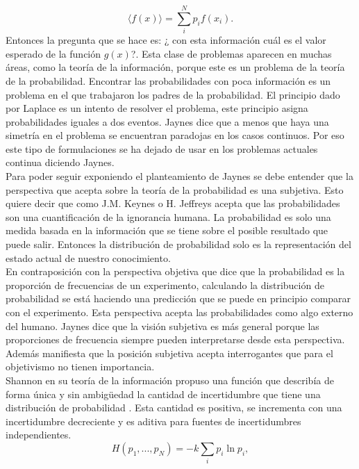 \begin{equation}
\langle f(x) \rangle =\sum_{i}^{N} p_{i} f(x_{i}).
\end{equation}
Entonces la pregunta que se hace es: ¿ con esta información cuál es el valor esperado de la función $g(x)$?. Esta clase de problemas aparecen en muchas áreas, como la teoría de la información, porque este es un problema de la teoría de la probabilidad. Encontrar las probabilidades con poca información es un problema en el que trabajaron los padres de la probabilidad. El principio dado por Laplace es un intento de resolver el problema, este principio asigna probabilidades iguales a dos eventos. Jaynes dice que a menos que haya una simetría en el problema se encuentran paradojas en los casos continuos. Por eso este tipo de formulaciones se ha dejado de usar en los problemas actuales continua diciendo Jaynes.
\\
Para poder seguir exponiendo el planteamiento de Jaynes se debe entender que la perspectiva que acepta sobre la teoría de la probabilidad es una subjetiva. Esto quiere decir que como J.M. Keynes o H. Jeffreys acepta que las probabilidades son una cuantificación de la ignorancia humana. La probabilidad es solo una medida basada en la información que se tiene sobre el posible resultado que puede salir. Entonces la distribución de probabilidad solo es la representación del estado actual de nuestro conocimiento. \\
En contraposición con la perspectiva objetiva que dice que la probabilidad es la proporción de frecuencias de un experimento, calculando la distribución de probabilidad se está haciendo una predicción que se puede en principio comparar con el experimento. Esta perspectiva acepta las probabilidades como algo externo del humano. Jaynes dice que la visión subjetiva es más general porque las proporciones de frecuencia siempre pueden interpretarse desde esta perspectiva. Además manifiesta que la posición subjetiva acepta interrogantes que para el objetivismo no tienen importancia. 
\\
Shannon en su teoría de la información propuso una función que describía de forma única y sin ambigüedad la cantidad de incertidumbre que tiene una distribución de probabilidad \cite{ShannonInformation}. Esta cantidad es positiva, se incrementa con una incertidumbre decreciente y es aditiva para fuentes de incertidumbres independientes.
\begin{equation}
H(p_{1},...,p_{N})=-k \sum_{i} p_{i} \ln p_{i},
\end{equation}
